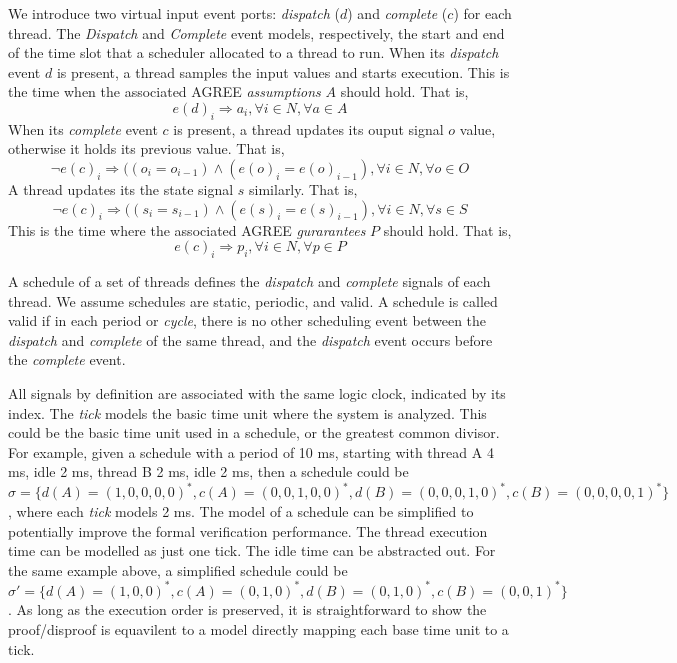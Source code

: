 We introduce two virtual input event ports: \emph{dispatch} ($d$) and \emph{complete} ($c$) for each thread.  The \emph{Dispatch} and \emph{Complete} event models, respectively, the start and end of the time slot that a scheduler allocated to a thread to run. 
When its \emph{dispatch} event $d$ is present, a thread samples the input values and starts execution. This is the time when the associated AGREE \emph{assumptions} $A$ should hold. That is,
$$e(d)_i \Rightarrow a_i, \forall i\in N, \forall a \in A $$
When its \emph{complete} event $c$ is present, a thread updates its ouput signal $o$ value, otherwise it holds its previous value. That is, 
$$\lnot e(c)_i \Rightarrow ((o_i = o_{i-1}) \land (e(o)_i = e(o)_{i-1}), \forall i \in N, \forall o \in O$$
A thread updates its the state signal $s$ similarly. That is,
$$\lnot e(c)_i \Rightarrow ((s_i = s_{i-1}) \land (e(s)_i = e(s)_{i-1}), \forall i \in N, \forall s \in S$$
This is the time where the associated AGREE \emph{gurarantees} $P$ should hold. That is,
$$e(c)_i \Rightarrow p_i, \forall i\in N, \forall p \in P $$


A schedule of a set of threads defines the \emph{dispatch} and \emph{complete} signals of each thread. We assume schedules are static, periodic, and valid. A schedule is called valid if in each period or \emph{cycle}, there is no other scheduling event between the \emph{dispatch} and \emph{complete} of the same thread, and the \emph{dispatch} event occurs before the \emph{complete} event.

All signals by definition are associated with the same logic clock, indicated by its index. The \emph{tick} models the basic time unit where the system is analyzed. This could be the basic time unit used in a schedule, or the greatest common divisor. For example, given a schedule with a period of 10 ms, starting with thread A 4 ms, idle 2 ms, thread B 2 ms, idle 2 ms, then a schedule could be $\sigma = \{d(A)=(1,0,0,0,0)^*, c(A) = (0,0,1,0,0)^*, d(B) = (0,0,0,1,0)^*, c(B) = (0,0,0,0,1)^*\}$, where each \emph{tick} models 2 ms. The model of a schedule can be simplified to potentially improve the formal verification performance. The thread execution time can be modelled as just one tick. The idle time can be abstracted out. For the same example above, a simplified schedule could be  $\sigma' = \{d(A)=(1,0,0)^*, c(A) = (0,1,0)^*, d(B) = (0,1,0)^*, c(B) = (0,0,1)^*\}$. As long as the execution order is preserved, it is straightforward to show the proof/disproof is equavilent to a model directly mapping each base time unit to a tick.

